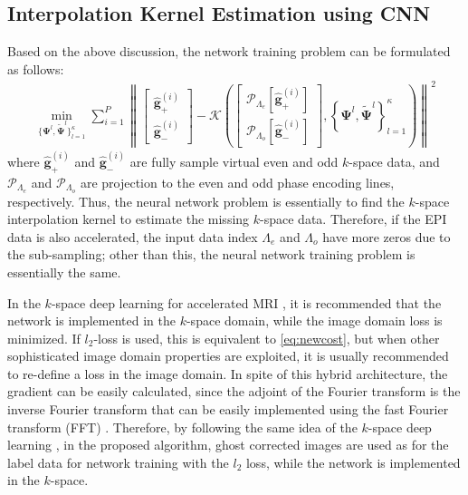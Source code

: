 \documentclass[num-refs]{wiley-article}
\newcommand{\gb}{{\mathbf g}}
\newcommand{\Psib}{{\boldsymbol {\Psi}}}
\newcommand{\0}{{\boldsymbol{0}}}
\newcommand{\Kc}{{{\mathcal K}}}
\newcommand{\Pc}{{{\mathcal P}}}
\newcommand{\1}{\blmath{1}}
\begin{document}
	
	
	\subsection{Interpolation Kernel Estimation using CNN}
	
	Based on the above discussion, the network training problem  can be formulated as follows:
	\begin{eqnarray}\label{eq:newcost}
	\min_{ \{\Psib^l, \widetilde\Psib^l\}_{l=1}^\kappa} \sum_{i=1}^P
	\left\|  \begin{bmatrix} \widehat \gb_+^{(i)} \\ \widehat \gb_-^{(i)} \end{bmatrix} -
	\Kc\left( \begin{bmatrix} \Pc_{\Lambda_e}\left[\widehat \gb_+^{(i)} \right]\\  \Pc_{\Lambda_o}\left[\widehat \gb_-^{(i)} \right]\end{bmatrix}, \left\{\Psib^l,\tilde\Psib^l\right\}_{l=1}^\kappa\right)
	\right\|^2 %
	\end{eqnarray}
	where $\widehat \gb_+^{(i)}$ and $\widehat \gb_-^{(i)}$ are fully sample virtual even and odd $k$-space data,
	and $\Pc_{\Lambda_e}$ and $\Pc_{\Lambda_o}$ are projection to the even and odd phase encoding lines, respectively.
	Thus, the neural network problem is essentially to find the $k$-space interpolation kernel to estimate the missing $k$-space data. Therefore, if the EPI data is also accelerated, the input data index $\Lambda_e$ and $\Lambda_o$ have more zeros due to the sub-sampling; other than this, the neural network training problem is essentially the same.
	
	
	
	In the $k$-space deep learning for accelerated MRI \cite{han2018k}, it is recommended that the network is implemented in the $k$-space domain, while the image domain loss is minimized. If $l_2$-loss is used, this is equivalent to \eqref{eq:newcost}, but when other sophisticated image domain properties are exploited, it is usually recommended to re-define a loss in the image domain. In spite of this hybrid architecture, the gradient can be easily calculated, since the adjoint of the Fourier transform is the inverse Fourier transform that can be easily implemented using the fast Fourier transform (FFT) \cite{han2018k}.
	Therefore,  by following the same idea of the $k$-space deep learning \cite{han2018k}, in the proposed algorithm, ghost corrected images are used as for the label data for network training with the $l_2$ loss, while the network is implemented in the $k$-space.
	
\end{document}
